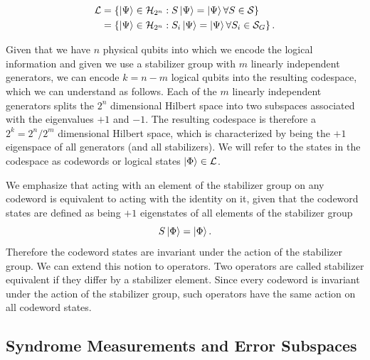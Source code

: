 \begin{align}
    \mathcal{L} &= \left\{  \ket{\Psi} \in  \mathcal{H}_{2^n} : S \ket{\Psi} = \ket{\Psi} \forall S \in \mathcal{S} \right\}
    \label{eq:defintion_codespace_whole_group} \\
     &= \left\{  \ket{\Psi} \in  \mathcal{H}_{2^n} : S_i \ket{\Psi} = \ket{\Psi} \forall S_i \in \mathcal{S}_G \right\}.
    \label{eq:defintion_codespace_generators}
\end{align}

Given that we have $n$ physical qubits into which we encode the logical information and given we use a stabilizer group with $m$ linearly independent generators, 
we can encode $k=n-m$ logical qubits into the resulting codespace, 
which we can understand as follows.
Each of the $m$ linearly independent generators splits the $2^n$ dimensional Hilbert space into two subspaces associated with the eigenvalues $+1$ and $-1$.
The resulting codespace is therefore a $2^k=2^n/2^m$ dimensional Hilbert space, which is characterized by being the $+1$ eigenspace of all generators (and all stabilizers).
We will refer to the states in the codespace as codewords or logical states $\ket{\Phi}\in \mathcal{L}$.

We emphasize that acting with an element of the stabilizer group on any codeword is equivalent to acting with the identity on it,
given that the codeword states are defined as being $+1$ eigenstates of all elements of the stabilizer group
\begin{equation}
    S \ket{\Phi} = \ket{\Phi}.
    \label{eq:stabilizer_equivalence}
\end{equation}
Therefore the codeword states are invariant under the action of the stabilizer group.
We can extend this notion to operators.
Two operators are called stabilizer equivalent if they differ by a stabilizer element. 
Since every codeword is invariant under the action of the stabilizer group, such operators have the same action on all codeword states.


\subsection{Syndrome Measurements and Error Subspaces}\label{ssec:syndrome}

